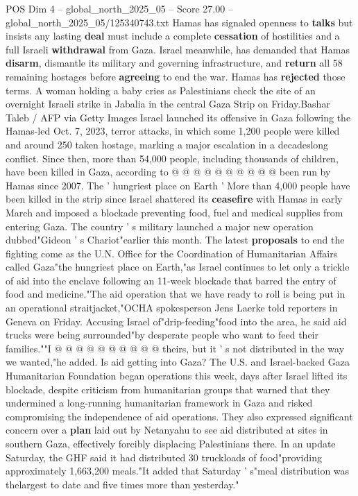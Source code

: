 \begin{textsample}{POS Dim 4 – global\_north\_2025\_05 – Score 27.00 – global\_north\_2025\_05/125340743.txt}
Hamas has signaled openness to \textbf{talks} but insists any lasting \textbf{deal} must include a complete \textbf{cessation} of hostilities and a full Israeli \textbf{withdrawal} from Gaza.
Israel meanwhile, has demanded that Hamas \textbf{disarm}, dismantle its military and governing infrastructure, and \textbf{return} all 58 remaining hostages before \textbf{agreeing} to end the war.
Hamas has \textbf{rejected} those terms.
A woman holding a baby cries as Palestinians check the site of an overnight Israeli strike in Jabalia in the central Gaza Strip on Friday.Bashar Taleb / AFP via Getty Images Israel launched its offensive in Gaza following the Hamas-led Oct. 7, 2023, terror attacks, in which some 1,200 people were killed and around 250 taken hostage, marking a major escalation in a decadeslong conflict.
Since then, more than 54,000 people, including thousands of children, have been killed in Gaza, according to @ @ @ @ @ @ @ @ @ @ been run by Hamas since 2007.
The ' hungriest place on Earth ' More than 4,000 people have been killed in the strip since Israel shattered its \textbf{ceasefire} with Hamas in early March and imposed a blockade preventing food, fuel and medical supplies from entering Gaza.
The country ' s military launched a major new operation dubbed"Gideon ' s Chariot"earlier this month.
The latest \textbf{proposals} to end the fighting come as the U.N.
Office for the Coordination of Humanitarian Affairs called Gaza"the hungriest place on Earth,"as Israel continues to let only a trickle of aid into the enclave following an 11-week blockade that barred the entry of food and medicine."The aid operation that we have ready to roll is being put in an operational straitjacket,"OCHA spokesperson Jens Laerke told reporters in Geneva on Friday.
Accusing Israel of"drip-feeding"food into the area, he said aid trucks were being surrounded"by desperate people who want to feed their families.""I @ @ @ @ @ @ @ @ @ @ theirs, but it ' s not distributed in the way we wanted,"he added.
Is aid getting into Gaza?
The U.S. and Israel-backed Gaza Humanitarian Foundation began operations this week, days after Israel lifted its blockade, despite criticism from humanitarian groups that warned that they undermined a long-running humanitarian framework in Gaza and risked compromising the independence of aid operations.
They also expressed significant concern over a \textbf{plan} laid out by Netanyahu to see aid distributed at sites in southern Gaza, effectively forcibly displacing Palestinians there.
In an update Saturday, the GHF said it had distributed 30 truckloads of food"providing approximately 1,663,200 meals."It added that Saturday ' s"meal distribution was thelargest to date and five times more than yesterday."

\end{textsample}
